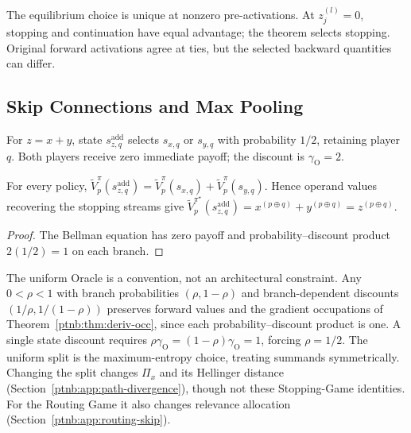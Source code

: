 \begin{remark}\label{ptnb:rem:adf-spne-uniqueness}
The equilibrium choice is unique at nonzero pre-activations. At $z_j^{(l)}=0$, stopping and
continuation have equal advantage; the theorem selects stopping.
Original forward activations agree at ties, but the selected backward quantities can differ.
\end{remark}

\subsection{Skip Connections and Max Pooling}\label{ptnb:app:skip-connections}

\begin{definition}\label{ptnb:def:addition-subgame}
For $z=x+y$, state $s_{z,q}^{\mathrm{add}}$ selects $s_{x,q}$ or $s_{y,q}$ with probability
$1/2$, retaining player $q$. Both players receive zero immediate payoff; the discount is
$\gamma_{\mathrm O}=2$.
\end{definition}
\begin{proposition}\label{ptnb:prop:addition-equivalence}
For every policy,
$\tilde V_p^\pi(s_{z,q}^{\mathrm{add}})=\tilde V_p^\pi(s_{x,q})+\tilde V_p^\pi(s_{y,q})$.
Hence operand values recovering the stopping streams give
$\tilde V_p^{\pi^\star}(s_{z,q}^{\mathrm{add}})=x^{(p\oplus q)}+y^{(p\oplus q)}=z^{(p\oplus q)}$.
\end{proposition}
\begin{proof}
The Bellman equation has zero payoff and probability--discount product $2(1/2)=1$ on each branch.
\end{proof}

The uniform Oracle is a convention, not an architectural constraint. Any $0<\rho<1$ with branch
probabilities $(\rho,1-\rho)$ and branch-dependent discounts $(1/\rho,1/(1-\rho))$ preserves
forward values and the gradient occupations of Theorem~\ref{ptnb:thm:deriv-occ}, since each
probability--discount product is one. A single state discount requires
$\rho\gamma_{\mathrm O}=(1-\rho)\gamma_{\mathrm O}=1$, forcing $\rho=1/2$.
The uniform split is the maximum-entropy choice, treating summands symmetrically. Changing the split changes
$\Pi_x$ and its Hellinger distance (Section~\ref{ptnb:app:path-divergence}), though not these
Stopping-Game identities. For the Routing Game it also changes relevance allocation
(Section~\ref{ptnb:app:routing-skip}).

